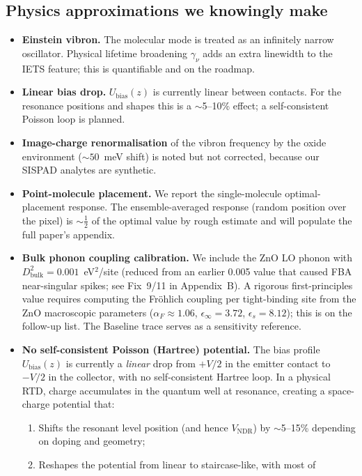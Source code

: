 \documentclass[11pt,a4paper,onecolumn]{article}
\begin{document}
\subsection{Physics approximations we knowingly make}
\begin{itemize}[leftmargin=1.3em,itemsep=0pt]
\item \textbf{Einstein vibron.} The molecular mode is treated as an infinitely
narrow oscillator. Physical lifetime broadening $\gamma_\nu$ adds an extra
linewidth to the IETS feature; this is quantifiable and on the roadmap.
\item \textbf{Linear bias drop.} $U_{\mathrm{bias}}(z)$ is currently linear
between contacts. For the resonance positions and shapes this is a
$\sim$5--10\% effect; a self-consistent Poisson loop is planned.
\item \textbf{Image-charge renormalisation} of the vibron frequency by the
oxide environment ($\sim 50$~meV shift) is noted but not corrected, because
our SISPAD analytes are synthetic.
\item \textbf{Point-molecule placement.} We report the single-molecule
optimal-placement response. The ensemble-averaged response (random
position over the pixel) is $\sim\!\tfrac12$ of the optimal value by
rough estimate and will populate the full paper's appendix.
\item \textbf{Bulk phonon coupling calibration.} We include the ZnO LO phonon
with $D^2_{\mathrm{bulk}} = 0.001$~eV$^2$/site (reduced from an earlier
0.005 value that caused FBA near-singular spikes; see Fix~9/11 in Appendix~B).
A rigorous first-principles
value requires computing the Fr\"ohlich coupling per tight-binding site
from the ZnO macroscopic parameters ($\alpha_F \approx 1.06$,
$\epsilon_\infty = 3.72$, $\epsilon_s = 8.12$); this is on the follow-up list.
The Baseline trace serves as a sensitivity reference.
\item \textbf{No self-consistent Poisson (Hartree) potential.} The bias
profile $U_{\mathrm{bias}}(z)$ is currently a \emph{linear} drop from
$+V/2$ in the emitter contact to $-V/2$ in the collector, with no
self-consistent Hartree loop. In a physical RTD, charge accumulates in the
quantum well at resonance, creating a space-charge potential that:
\begin{enumerate}[leftmargin=1em]
\item Shifts the resonant level position (and hence $V_{\mathrm{NDR}}$)
by $\sim$5--15\% depending on doping and geometry;
\item Reshapes the potential from linear to staircase-like, with most of

\end{enumerate}
\end{itemize}
\end{document}
